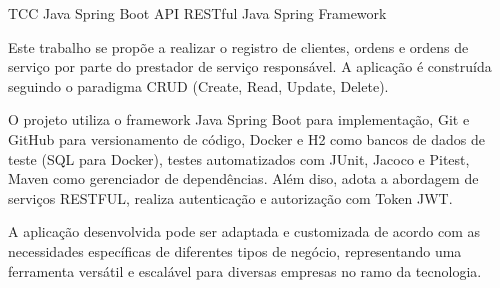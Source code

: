 \palavraschaves
{TCC Java Spring Boot}
{API RESTful}
{Java}
{Spring Framework}




Este trabalho se propõe a realizar o registro de clientes, ordens e ordens de serviço por parte do prestador de serviço responsável. A aplicação é construída seguindo o paradigma CRUD (Create, Read, Update, Delete).

O projeto utiliza o framework Java Spring Boot para implementação, Git e GitHub para versionamento de código, Docker e H2 como bancos de dados de teste (SQL para Docker), testes automatizados com JUnit, Jacoco e Pitest, Maven como gerenciador de dependências. Além diso, adota a abordagem de serviços RESTFUL, realiza autenticação e autorização com Token JWT.

A aplicação desenvolvida pode ser adaptada e customizada de acordo com as necessidades específicas de diferentes tipos de negócio, representando uma ferramenta versátil e escalável para diversas empresas no ramo da tecnologia.\\

\imprimirchaves %


